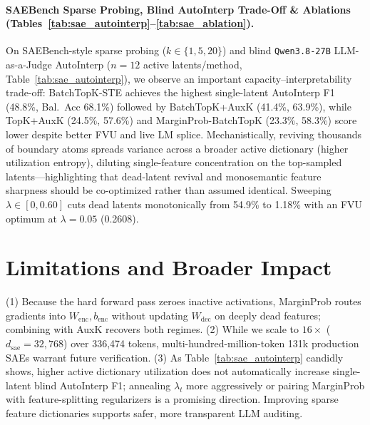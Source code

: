\documentclass[10pt]{article}
\begin{document}
\paragraph{SAEBench Sparse Probing, Blind AutoInterp Trade-Off \& Ablations (Tables~\ref{tab:sae_autointerp}--\ref{tab:sae_ablation}).} On SAEBench-style sparse probing ($k \in \{1,5,20\}$) and blind \texttt{Qwen3.8-27B} LLM-as-a-Judge AutoInterp ($n=12$ active latents/method, Table~\ref{tab:sae_autointerp}), we observe an important capacity--interpretability trade-off: BatchTopK-STE achieves the highest single-latent AutoInterp F1 (48.8\%, Bal.\ Acc 68.1\%) followed by BatchTopK+AuxK (41.4\%, 63.9\%), while TopK+AuxK (24.5\%, 57.6\%) and MarginProb-BatchTopK (23.3\%, 58.3\%) score lower despite better FVU and live LM splice. Mechanistically, reviving thousands of boundary atoms spreads variance across a broader active dictionary (higher utilization entropy), diluting single-feature concentration on the top-sampled latents---highlighting that dead-latent revival and monosemantic feature sharpness should be co-optimized rather than assumed identical. Sweeping $\lambda \in [0, 0.60]$ cuts dead latents monotonically from 54.9\% to 1.18\% with an FVU optimum at $\lambda=0.05$ (0.2608).

\section{Limitations and Broader Impact}
(1) Because the hard forward pass zeroes inactive activations, MarginProb routes gradients into $W_{\mathrm{enc}}, b_{\mathrm{enc}}$ without updating $W_{\mathrm{dec}}$ on deeply dead features; combining with AuxK recovers both regimes. (2) While we scale to $16\times$ ($d_{\mathrm{sae}}=32{,}768$) over 336,474 tokens, multi-hundred-million-token 131k production SAEs warrant future verification. (3) As Table~\ref{tab:sae_autointerp} candidly shows, higher active dictionary utilization does not automatically increase single-latent blind AutoInterp F1; annealing $\lambda_t$ more aggressively or pairing MarginProb with feature-splitting regularizers is a promising direction. Improving sparse feature dictionaries supports safer, more transparent LLM auditing.



\end{document}
